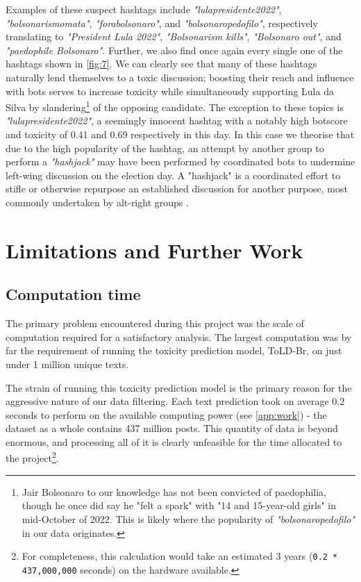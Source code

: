\documentclass[a4paper,11pt]{article}  %
\begin{document}
	Examples of these suspect hashtags include \textit{"lulapresidente2022"}, \textit{"bolsonarismomata"}, \textit{"forabolsonaro"}, and \textit{"bolsonaropedofilo"}, respectively translating to \textit{"President Lula 2022"}, \textit{"Bolsonarism kills"}, \textit{"Bolsonaro out"}, and \textit{"paedophile Bolsonaro"}. Further, we also find once again every single one of the hashtags shown in \autoref{fig:7}.  We can clearly see that many of these hashtags naturally lend themselves to a toxic discussion; boosting their reach and influence with bots serves to increase toxicity while simultaneously supporting Lula da Silva by slandering\footnote{Jair Bolsonaro to our knowledge has not been convicted of paedophilia, though he once did say he "felt a spark" with "14 and 15-year-old girls" in mid-October of 2022\parencite{BolsonaroSaysHe2022}. This is likely where the popularity of \textit{"bolsonaropedofilo"} in our data originates.} of the opposing candidate. The exception to these topics is \textit{"lulapresidente2022"}, a seemingly innocent hashtag with a notably high botscore and toxicity of 0.41 and 0.69 respectively in this day. In this case we theorise that due to the high popularity of the hashtag, an attempt by another group to perform a \textit{"hashjack"} may have been performed by coordinated bots to undermine left-wing discussion on the election day. A "hashjack" is a coordinated effort to stifle or otherwise repurpose an established discussion for another purpose, most commonly undertaken by alt-right groups \parencite{dariusHowFarRightPolarises2022}.
	
	\section{Limitations and Further Work}
	\subsection{Computation time}
	\label{subsec:computation}
	The primary problem encountered during this project was the scale of computation required for a satisfactory analysis. The largest computation was by far the requirement of running the toxicity prediction model, ToLD-Br\parencite{leiteToxicLanguageDetection2020}, on just under 1 million unique texts.
	
	The strain of running this toxicity prediction model is the primary reason for the aggressive nature of our data filtering. Each text prediction took on average 0.2 seconds to perform on the available computing power (see \autoref{app:work}) - the dataset as a whole contains 437 million posts. This quantity of data is beyond enormous, and processing all of it is clearly unfeasible for the time allocated to the project\footnote{For completeness, this calculation would take an estimated 3 years (\texttt{0.2 * 437,000,000} seconds) on the hardware available.}.
\end{document}
